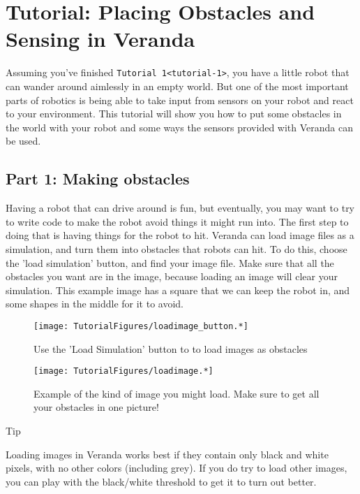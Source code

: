 \hypertarget{tutorial-placing-obstacles-and-sensing-in-veranda}{%
\section{Tutorial: Placing Obstacles and Sensing in
Veranda}\label{tutorial-placing-obstacles-and-sensing-in-veranda}}

Assuming you've finished
\texttt{Tutorial\ 1\textless{}tutorial-1\textgreater{}}, you have a
little robot that can wander around aimlessly in an empty world. But one
of the most important parts of robotics is being able to take input from
sensors on your robot and react to your environment. This tutorial will
show you how to put some obstacles in the world with your robot and some
ways the sensors provided with Veranda can be used.

\hypertarget{part-1-making-obstacles}{%
\subsection{Part 1: Making obstacles}\label{part-1-making-obstacles}}

Having a robot that can drive around is fun, but eventually, you may
want to try to write code to make the robot avoid things it might run
into. The first step to doing that is having things for the robot to
hit. Veranda can load image files as a simulation, and turn them into
obstacles that robots can hit. To do this, choose the 'load simulation'
button, and find your image file. Make sure that all the obstacles you
want are in the image, because loading an image will clear your
simulation. This example image has a square that we can keep the robot
in, and some shapes in the middle for it to avoid.

\begin{figure}
\centering
\texttt{[image: TutorialFigures/loadimage\_button.*]}
\caption{Use the 'Load Simulation' button to to load images as
obstacles}
\end{figure}

\begin{figure}
\centering
\texttt{[image: TutorialFigures/loadimage.*]}
\caption{Example of the kind of image you might load. Make sure to get
all your obstacles in one picture!}
\end{figure}

Tip

Loading images in Veranda works best if they contain only black and
white pixels, with no other colors (including grey). If you do try to
load other images, you can play with the black/white threshold to get it
to turn out better.

